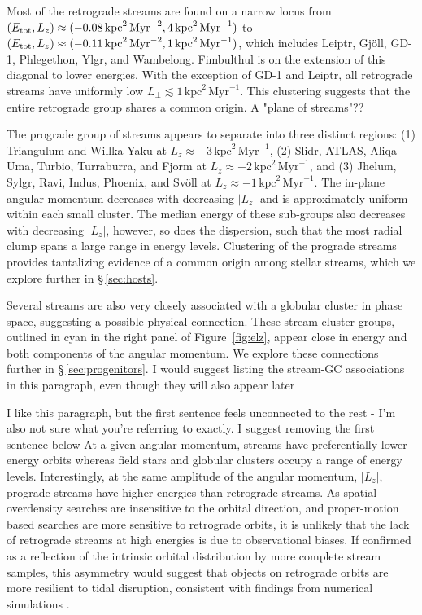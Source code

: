 \documentclass[twocolumn]{aastex63}
\newcommand{\ul}{\ensuremath{\textrm{kpc}^2\,\textrm{Myr}^{-1}}}
\newcommand{\ue}{\ensuremath{\textrm{kpc}^2\,\textrm{Myr}^{-2}}}
\begin{document}
Most of the retrograde streams are found on a narrow locus from $(E_{\rm tot}, L_z)\approx(-0.08\,\ue,\allowbreak 4\,\ul)$ to $(E_{\rm tot}, L_z)\approx(-0.11\,\ue,\allowbreak 1\,\ul)$, which includes Leiptr, Gj\" oll, GD-1, Phlegethon, Ylgr, and Wambelong.
Fimbulthul is on the extension of this diagonal to lower energies.
With the exception of GD-1 and Leiptr, all retrograde streams have uniformly low $L_\perp\lesssim1\,\ul$.
This clustering suggests that the entire retrograde group shares a common origin.  {\color{red} A "plane of streams"??}

The prograde group of streams appears to separate into three distinct regions: (1) Triangulum and Willka Yaku at $L_z\approx-3\,\ul$, (2) Slidr, ATLAS, Aliqa Uma, Turbio, Turraburra, and Fjorm at $L_z\approx-2\,\ul$, and (3) Jhelum, Sylgr, Ravi, Indus, Phoenix, and Sv\" oll at $L_z\approx-1\,\ul$.
The in-plane angular momentum decreases with decreasing $|L_z|$ and is approximately uniform within each small cluster.
The median energy of these sub-groups also decreases with decreasing $|L_z|$, however, so does the dispersion, such that the most radial clump spans a large range in energy levels.
Clustering of the prograde streams  provides tantalizing evidence of a common origin among stellar streams, which we explore further in \S\,\ref{sec:hosts}.

Several streams are also very closely associated with a globular cluster in phase space, suggesting a possible physical connection.
These stream-cluster groups, outlined in cyan in the right panel of Figure~\ref{fig:elz}, appear close in energy and both components of the angular momentum.
We explore these connections further in \S\,\ref{sec:progenitors}.  {\color{red} I would suggest listing the stream-GC associations in this paragraph, even though they will also appear later}

{\color{red} I like this paragraph, but the first sentence feels unconnected to the rest - I'm also not sure what you're referring to exactly.  I suggest removing the first sentence below}
At a given angular momentum, streams have preferentially lower energy orbits whereas field stars and globular clusters occupy a range of energy levels.
Interestingly, at the same amplitude of the angular momentum, $|L_z|$, prograde streams have higher energies than retrograde streams.
As spatial-overdensity searches are insensitive to the orbital direction, and proper-motion based searches are more sensitive to retrograde orbits, it is unlikely that the lack of retrograde streams at high energies is due to observational biases.
If confirmed as a reflection of the intrinsic orbital distribution by more complete stream samples, this asymmetry would suggest that objects on retrograde orbits are more resilient to tidal disruption, consistent with findings from numerical simulations \citep[e.g.,][]{find}.
\end{document}
